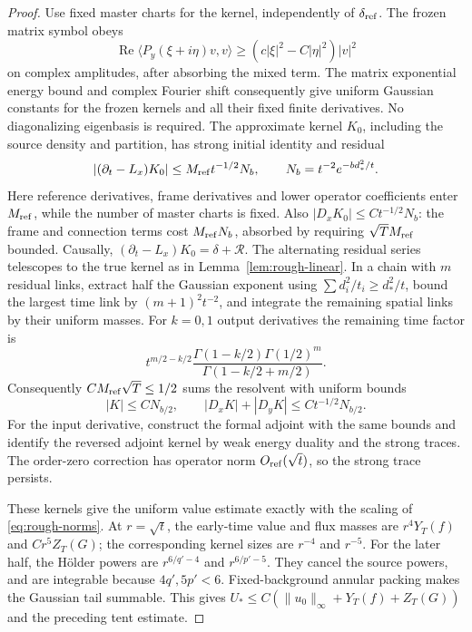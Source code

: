 \documentclass[11pt]{article}
\numberwithin{equation}{section}
\theoremstyle{definition}
\theoremstyle{remark}
\begin{document}
\begin{proof}
Use fixed master charts for the kernel, independently of
\(\delta_{\rm ref}\). The frozen matrix symbol obeys
\[
 \operatorname{Re}\langle P_y(\xi+i\eta)v,v\rangle
 \ge(c|\xi|^2-C|\eta|^2)|v|^2
\]
on complex amplitudes, after absorbing the mixed term.
The matrix exponential energy bound and complex Fourier
shift consequently give uniform Gaussian constants for
the frozen kernels and all their fixed finite derivatives.
No diagonalizing eigenbasis is required. The approximate
kernel \(K_0\), including the source density and partition,
has strong initial identity and residual
\[
 |(\partial_t-L_x)K_0|\le
 M_{\rm ref}t^{-1/2}N_b,\qquad
 N_b=t^{-2}e^{-bd_*^2/t}.
\]
Here reference derivatives, frame derivatives and lower
operator coefficients enter \(M_{\rm ref}\), while the
number of master charts is fixed. Also
\(|D_xK_0|\le Ct^{-1/2}N_b\): the frame and connection
terms cost \(M_{\rm ref}N_b\), absorbed by requiring
\(\sqrt T M_{\rm ref}\) bounded. Causally,
\((\partial_t-L_x)K_0=\delta+\mathcal R\).
The alternating residual series telescopes to the true
kernel as in Lemma~\ref{lem:rough-linear}.
In a chain with \(m\)
residual links, extract half the Gaussian exponent using
\(\sum d_i^2/t_i\ge d_*^2/t\), bound the largest time link
by \((m+1)^2t^{-2}\), and integrate the remaining spatial
links by their uniform masses. For \(k=0,1\) output
derivatives the remaining time factor is
\[
 t^{m/2-k/2}
 \frac{\Gamma(1-k/2)\Gamma(1/2)^m}
      {\Gamma(1-k/2+m/2)}.
\]
Consequently \(CM_{\rm ref}\sqrt T\le1/2\) sums the
resolvent with uniform bounds
\[
 |K|\le CN_{b/2},\qquad
 |D_xK|+|D_yK|\le Ct^{-1/2}N_{b/2}.
\]
For the input derivative, construct the formal adjoint
with the same bounds and identify the reversed adjoint
kernel by weak energy duality and the strong traces.
The order-zero correction has operator norm
\(O_{\rm ref}(\sqrt t)\), so the strong trace persists.

These kernels give the uniform value estimate exactly
with the scaling of \eqref{eq:rough-norms}. At
\(r=\sqrt t\), the early-time value and flux masses
are \(r^4Y_T(f)\) and \(Cr^5Z_T(G)\); the corresponding
kernel sizes are \(r^{-4}\) and \(r^{-5}\).
For the later half, the Hölder powers are
\(r^{6/q'-4}\) and \(r^{6/p'-5}\).
They cancel the source powers, and are integrable because
\(4q',5p'<6\). Fixed-background annular packing makes
the Gaussian tail summable. This gives
\(U_*\le C(\|u_0\|_\infty+Y_T(f)+Z_T(G))\)
and the preceding tent estimate.


\end{proof}
\end{document}
